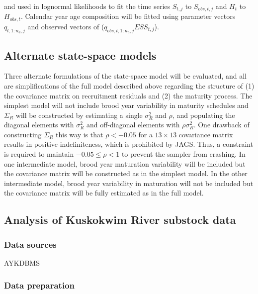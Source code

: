 \documentclass[12pt,]{book}
\theoremstyle{definition}
\theoremstyle{definition}
\theoremstyle{definition}
\theoremstyle{remark}
\begin{document}
\noindent
and used in lognormal likelihoods to fit the time series \(S_{t,j}\) to
\(S_{obs,t,j}\) and \(H_t\) to \(H_{obs,t}\). Calendar year age
composition will be fitted using parameter vectors \(q_{t,1:n_a,j}\) and
observed vectors of (\(q_{obs,t,1:n_a,j} ESS_{t,j}\)).

\subsection{Alternate state-space
models}\label{alternate-state-space-models}

Three alternate formulations of the state-space model will be evaluated,
and all are simplifications of the full model described above regarding
the structure of (1) the covariance matrix on recruitment residuals and
(2) the maturity process. The simplest model will not include brood year
variability in maturity schedules and \(\Sigma_R\) will be constructed
by estimating a single \(\sigma_R^2\) and \(\rho\), and populating the
diagonal elements with \(\sigma_R^2\) and off-diagonal elements with
\(\rho \sigma_R^2\). One drawback of constructing \(\Sigma_R\) this way
is that \(\rho < -0.05\) for a \(13 \times 13\) covariance matrix
results in positive-indefiniteness, which is prohibited by JAGS. Thus, a
constraint is required to maintain \(-0.05 \le \rho < 1\) to prevent the
sampler from crashing. In one intermediate model, brood year maturation
variability will be included but the covariance matrix will be
constructed as in the simplest model. In the other intermediate model,
brood year variability in maturation will not be included but the
covariance matrix will be fully estimated as in the full model.

\subsection{Analysis of Kuskokwim River substock
data}\label{analysis-of-kuskokwim-river-substock-data}

\subsubsection{Data sources}\label{data-sources}

AYKDBMS

\subsubsection{Data preparation}\label{data-preparation}
\end{document}
